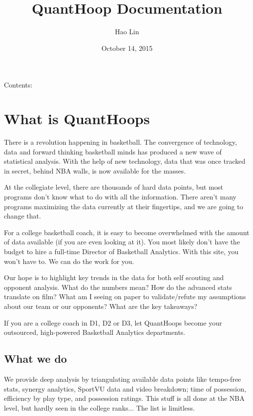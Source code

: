 \documentclass[letterpaper,10pt,english]{sphinxmanual}
\title{QuantHoop Documentation}
\date{October 14, 2015}
\author{Hao Lin}
\begin{document}
\maketitle
\tableofcontents
{}\label{index::doc}


Contents:


\chapter{What is QuantHoops}
\label{_static/basic:what-is-quanthoops}\label{_static/basic::doc}\label{_static/basic:welcome-to-quanthoop-s-documentation}
There is a revolution happening in basketball. The convergence of technology,
data and forward thinking basketball minds has produced a new wave of statistical
analysis. With the help of new technology, data that was once tracked in secret,
behind NBA walls, is now available for the masses.

At the collegiate level, there are thousands of hard data points, but most programs
don't know what to do with all the information. There aren't many programs
maximizing the data currently at their fingertips, and we are going to change that.

For a college basketball coach, it is easy to become overwhelmed with the amount
of data available (if you are even looking at it). You most likely don't have
the budget to hire a full-time Director of Basketball Analytics. With this
site, you won't have to. We can do the work for you.

Our hope is to highlight key trends in the data for both self scouting and
opponent analysis. What do the numbers mean? How do the advanced stats translate
on film? What am I seeing on paper to validate/refute my assumptions about our
team or our opponents? What are the key takeaways?

If you are a college coach in D1, D2 or D3, let QuantHoops become your outsourced,
high-powered Basketball Analytics departments.


\section{What we do}
\label{_static/basic:what-we-do}
We provide deep analysis by triangulating available data points like tempo-free
stats, synergy analytics, SportVU data and video breakdown; time of possession,
efficiency by play type, and possession ratings. This stuff is all done at the
NBA level, but hardly seen in the college ranks... The list is limitless.
\end{document}
